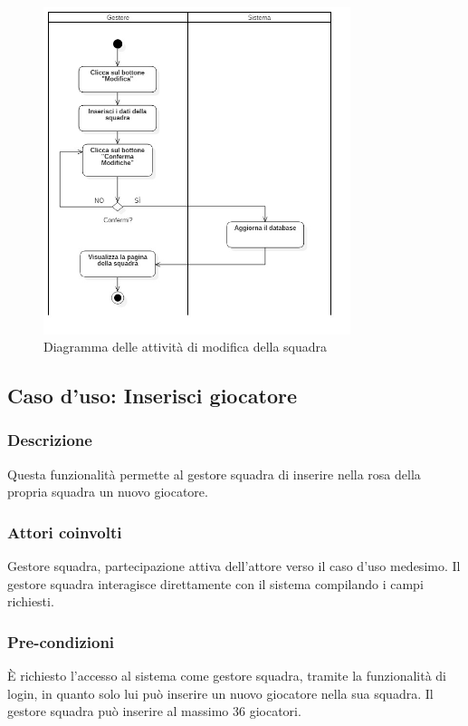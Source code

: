 %
%
\begin{figure}[h]
	\centering
	\includegraphics[width=0.8\textwidth]
	{immagini/ad-modifica-squadra}
	
	\caption{Diagramma delle attività di modifica della squadra}
	\label{ad-modifica-squadra}
\end{figure}


%
%
\subsection{Caso d'uso: Inserisci giocatore}
\label{uc-inserisci-giocatore}

\subsubsection*{Descrizione}
Questa funzionalità permette al gestore squadra di inserire nella rosa della propria squadra un nuovo giocatore.

\subsubsection*{Attori coinvolti}
Gestore squadra, partecipazione attiva dell'attore verso il caso d'uso medesimo.
Il gestore squadra interagisce direttamente con il sistema compilando i campi richiesti.

\subsubsection*{Pre-condizioni}
È richiesto l'accesso al sistema come gestore squadra, tramite la funzionalità di login, in quanto solo lui può inserire un nuovo giocatore nella sua squadra. Il gestore squadra può inserire al massimo 36 giocatori.

